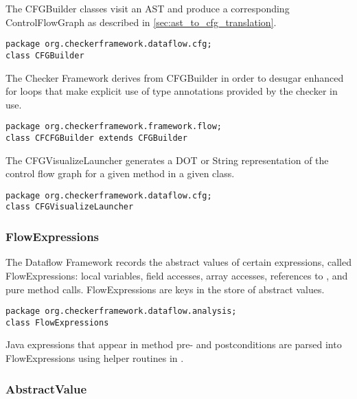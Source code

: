 \label{sec:cfg_builder_classes}

The CFGBuilder classes visit an AST and produce a corresponding
ControlFlowGraph as described in \autoref{sec:ast_to_cfg_translation}.

\begin{verbatim}
package org.checkerframework.dataflow.cfg;
class CFGBuilder
\end{verbatim}

The Checker Framework derives from CFGBuilder in order to desugar
enhanced for loops that make explicit use of type annotations provided
by the checker in use.

\begin{verbatim}
package org.checkerframework.framework.flow;
class CFCFGBuilder extends CFGBuilder
\end{verbatim}

\label{sec:cfg_visualize_launcher_class}

The CFGVisualizeLauncher generates a DOT or String representation of
the control flow graph for a given method in a given class.

\begin{verbatim}
package org.checkerframework.dataflow.cfg;
class CFGVisualizeLauncher
\end{verbatim}

\subsubsection{FlowExpressions}
\label{sec:flow_expressions_class}

The Dataflow Framework records the abstract values of certain
expressions, called FlowExpressions: local variables, field accesses,
array accesses, references to , and pure method calls.
FlowExpressions are keys in the store of abstract values.

\begin{verbatim}
package org.checkerframework.dataflow.analysis;
class FlowExpressions
\end{verbatim}

Java expressions that appear in method pre- and postconditions are
parsed into FlowExpressions using helper routines in
.


\subsubsection{AbstractValue}
\label{sec:abstract_value_classes}

